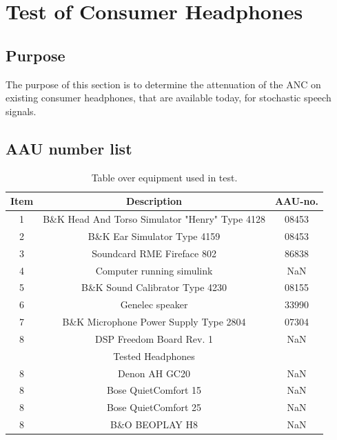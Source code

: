 
\section{Test of Consumer Headphones}
\subsection{Purpose}
The purpose of this section is to determine the attenuation of the ANC on existing consumer headphones, that are available today, for stochastic speech signals.




\subsection{AAU number list}
\begin{table}[H]
	\centering
	\begin{tabular}{ c c c } \toprule
		{Item}	& {Description} 						& {AAU-no}. \\ \bottomrule 
		1	&	B\&K Head And Torso Simulator "Henry" Type 4128	& 08453	\\
		2	&	B\&K Ear Simulator Type 4159				& 08453		\\
		3	&	Soundcard RME Fireface 802					& 86838		\\
		4	&	Computer running simulink					& NaN		\\
		5	&	B\&K Sound Calibrator Type 4230				& 08155		\\ 
		6	&	Genelec speaker								& 33990		\\ 
		7	& 	B\&K Microphone Power Supply Type 2804		& 07304		\\
		8	&	DSP Freedom Board Rev. 1 & NaN		\\
		\bottomrule
		& Tested Headphones & \\
		\bottomrule
	
		8 & Denon AH GC20 & NaN \\
		8 & Bose QuietComfort 15 & NaN \\
		8 & Bose QuietComfort 25 & NaN \\
		8 & B\&O BEOPLAY H8 & NaN \\
			\bottomrule
	\end{tabular}
	\caption{Table over equipment used in test.}
	\label{tab:UsedEquipmentListConsumerHP}
\end{table}



